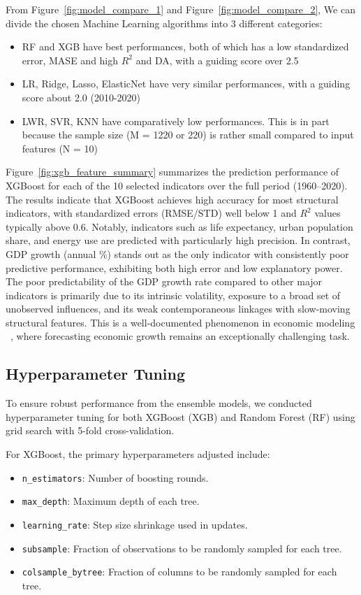 \documentclass[12pt]{article}
\begin{document}
From Figure~\ref{fig:model_compare_1} and Figure~\ref{fig:model_compare_2}, We can divide the chosen Machine Learning algorithms into 3 different categories: 
\begin{itemize}
\item RF and XGB have best performances, both of which has a low standardized error, MASE and high $R^2$ and DA, with a guiding score over 2.5
\item LR, Ridge, Lasso, ElasticNet have very similar performances, with a guiding score about 2.0 (2010-2020)
\item LWR, SVR, KNN have comparatively low performances. This is in part because the sample size (M = 1220 or 220) is rather small compared to input features (N = 10)
\end{itemize}
Figure~\ref{fig:xgb_feature_summary} summarizes the prediction performance of XGBoost for each of the 10 selected indicators over the full period (1960--2020). The results indicate that XGBoost achieves high accuracy for most structural indicators, with standardized errors (RMSE/STD) well below 1 and $R^2$ values typically above 0.6. Notably, indicators such as life expectancy, urban population share, and energy use are predicted with particularly high precision. In contrast, GDP growth (annual \%) stands out as the only indicator with consistently poor predictive performance, exhibiting both high error and low explanatory power. The poor predictability of the GDP growth rate compared to other major indicators is primarily due to its intrinsic volatility, exposure to a broad set of unobserved influences, and its weak contemporaneous linkages with slow-moving structural features. This is a well-documented phenomenon in economic modeling ~\cite{Loungani2001, ClementsHendry2002}, where forecasting economic growth remains an exceptionally challenging task.


\subsection{Hyperparameter Tuning}

To ensure robust performance from the ensemble models, we conducted hyperparameter tuning for both XGBoost (XGB) and Random Forest (RF) using grid search with 5-fold cross-validation.

For XGBoost, the primary hyperparameters adjusted include:
\begin{itemize}
    \item \texttt{n\_estimators}: Number of boosting rounds.
    \item \texttt{max\_depth}: Maximum depth of each tree.
    \item \texttt{learning\_rate}: Step size shrinkage used in updates.
    \item \texttt{subsample}: Fraction of observations to be randomly sampled for each tree.
    \item \texttt{colsample\_bytree}: Fraction of columns to be randomly sampled for each tree.
\end{itemize}
\end{document}
